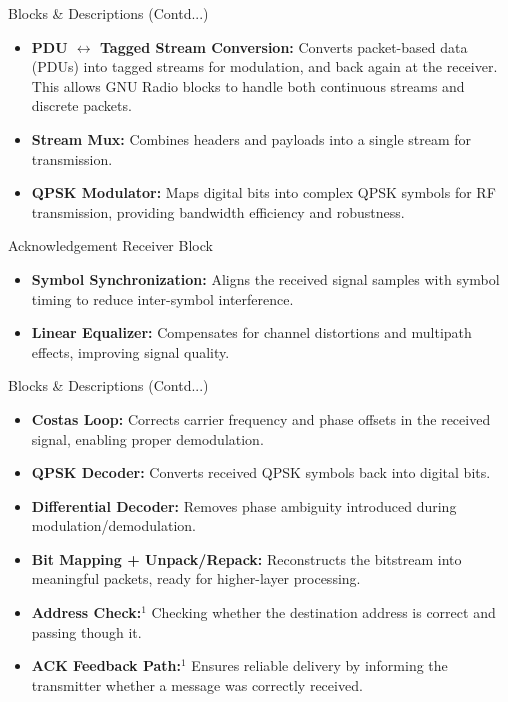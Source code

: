 \documentclass[11pt]{beamer}
\begin{document}
		\begin{frame}{Blocks \& Descriptions (Contd...)}
		\begin{itemize}
				\item \textbf{PDU $\leftrightarrow$ Tagged Stream Conversion:} 
			Converts packet-based data (PDUs) into tagged streams for modulation, and back again 
			at the receiver. This allows GNU Radio blocks to handle both continuous streams and discrete packets.
		\item \textbf{Stream Mux:} 
		Combines headers and payloads into a single stream for transmission.
		
		\item \textbf{QPSK Modulator:} 
		Maps digital bits into complex QPSK symbols for RF transmission, providing 
		bandwidth efficiency and robustness.
		
	\end{itemize}
	\vspace{0.5cm}
	Acknowledgement Receiver Block
	\begin{itemize}
		    \item \textbf{Symbol Synchronization:} 
		Aligns the received signal samples with symbol timing to reduce inter-symbol interference.
		
		\item \textbf{Linear Equalizer:} 
		Compensates for channel distortions and multipath effects, improving signal quality.
		
		
	
	\end{itemize}
\end{frame}
\begin{frame}{Blocks \& Descriptions (Contd...)}
	\begin{itemize}
	\item \textbf{Costas Loop:} 
	Corrects carrier frequency and phase offsets in the received signal, enabling proper demodulation.
	
			\item \textbf{QPSK Decoder:} 
		Converts received QPSK symbols back into digital bits.
		
		\item \textbf{Differential Decoder:} 
		Removes phase ambiguity introduced during modulation/demodulation.
		
		\item \textbf{Bit Mapping + Unpack/Repack:} 
		Reconstructs the bitstream into meaningful packets, ready for higher-layer processing.
	\item \textbf{Address Check:$^1$} Checking whether the destination address is correct and passing though it.
		
		\item \textbf{ACK Feedback Path:$^1$} 
		Ensures reliable delivery by informing the transmitter whether a message was correctly received.
		
	\end{itemize}
	\end{frame}
\end{document}
